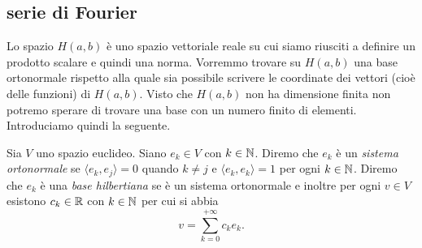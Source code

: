 \subsection{serie di Fourier}
\label{sec:serie_fourier}
%
%

Lo spazio $H(a,b)$ è uno spazio vettoriale reale su cui siamo riusciti a definire
un prodotto scalare e quindi una norma. Vorremmo trovare su $H(a,b)$ una base
ortonormale rispetto alla quale sia possibile scrivere le coordinate dei vettori
(cioè delle funzioni) di $H(a,b)$. Visto che $H(a,b)$ non ha dimensione finita
non potremo sperare di trovare una base con un numero finito di elementi.
Introduciamo quindi la seguente.

\begin{definition}
Sia $V$ uno spazio euclideo. Siano $e_k\in V$ con $k\in {\mathbb N}$. Diremo che
$e_k$ è un \emph{sistema ortonormale}%
 se $\langle e_k, e_j\rangle = 0$ quando
$k\neq j$ e $\langle e_k, e_k\rangle = 1$ per ogni $k\in {\mathbb N}$.
Diremo che $e_k$ è una \emph{base hilbertiana}%
 se è un sistema ortonormale
e inoltre per ogni $v\in V$
esistono $c_k\in {\mathbb R}$ con $k\in{\mathbb N}$ per cui si abbia
\begin{equation}\label{eq:49346}
  v = \sum_{k=0}^{+\infty} c_k e_k.
\end{equation}
\end{definition}

